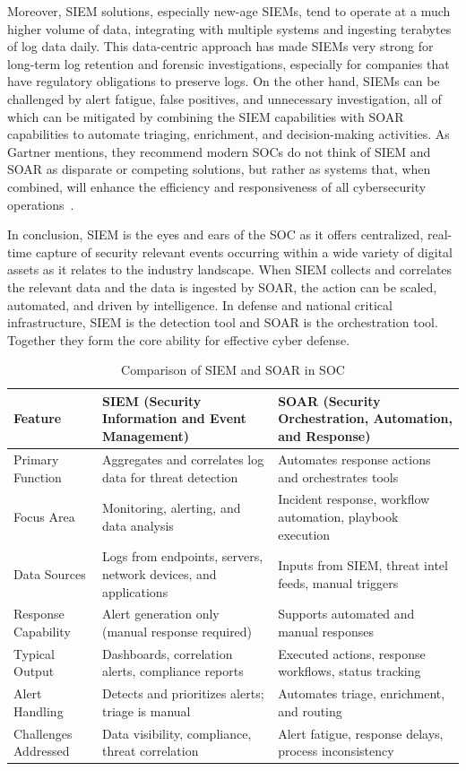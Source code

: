 Moreover, SIEM solutions, especially new-age SIEMs, tend to operate at a much higher volume of data, integrating with multiple systems and ingesting terabytes of log data daily. This data-centric approach has made SIEMs very strong for long-term log retention and forensic investigations, especially for companies that have regulatory obligations to preserve logs. On the other hand, SIEMs can be challenged by alert fatigue, false positives, and unnecessary investigation, all of which can be mitigated by combining the SIEM capabilities with SOAR capabilities to automate triaging, enrichment, and decision-making activities. As Gartner mentions, they recommend modern SOCs do not think of SIEM and SOAR as disparate or competing solutions, but rather as systems that, when combined, will enhance the efficiency and responsiveness of all cybersecurity operations~\cite{gartner-siem-soar}.

In conclusion, SIEM is the eyes and ears of the SOC as it offers centralized, real-time capture of security relevant events occurring within a wide variety of digital assets as it relates to the industry landscape. When SIEM collects and correlates the relevant data and the data is ingested by SOAR, the action can be scaled, automated, and driven by intelligence. In defense and national critical infrastructure, SIEM is the detection tool and SOAR is the orchestration tool. Together they form the core ability for effective cyber defense.

\begin{table}[H]
\centering
\caption{Comparison of SIEM and SOAR in SOC}
\begin{tabular}{|p{4cm}|p{5cm}|p{5cm}|}
\hline
\textbf{Feature} & \textbf{SIEM (Security Information and Event Management)} & \textbf{SOAR (Security Orchestration, Automation, and Response)} \\
\hline
Primary Function & Aggregates and correlates log data for threat detection & Automates response actions and orchestrates tools \\
\hline
Focus Area & Monitoring, alerting, and data analysis & Incident response, workflow automation, playbook execution \\
\hline
Data Sources & Logs from endpoints, servers, network devices, and applications & Inputs from SIEM, threat intel feeds, manual triggers \\
\hline
Response Capability & Alert generation only (manual response required) & Supports automated and manual responses \\
\hline
Typical Output & Dashboards, correlation alerts, compliance reports & Executed actions, response workflows, status tracking \\
\hline
Alert Handling & Detects and prioritizes alerts; triage is manual & Automates triage, enrichment, and routing \\
\hline
Challenges Addressed & Data visibility, compliance, threat correlation & Alert fatigue, response delays, process inconsistency \\
\hline
\end{tabular}
\label{tab:siem-vs-soar}
\end{table}

